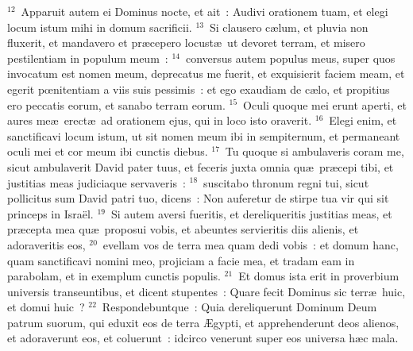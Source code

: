 ${}^{12}$~Apparuit autem ei Dominus nocte, et ait~: Audivi orationem tuam, et elegi locum istum mihi in domum sacrificii.
${}^{13}$~Si clausero c\ae lum, et pluvia non fluxerit, et mandavero et pr\ae cepero locust\ae\ ut devoret terram, et misero pestilentiam in populum meum~:
${}^{14}$~conversus autem populus meus, super quos invocatum est nomen meum, deprecatus me fuerit, et exquisierit faciem meam, et egerit pœnitentiam a viis suis pessimis~: et ego exaudiam de c\ae lo, et propitius ero peccatis eorum, et sanabo terram eorum.
${}^{15}$~Oculi quoque mei erunt aperti, et aures me\ae\ erect\ae\ ad orationem ejus, qui in loco isto oraverit.
${}^{16}$~Elegi enim, et sanctificavi locum istum, ut sit nomen meum ibi in sempiternum, et permaneant oculi mei et cor meum ibi cunctis diebus.
${}^{17}$~Tu quoque si ambulaveris coram me, sicut ambulaverit David pater tuus, et feceris juxta omnia qu\ae\ pr\ae cepi tibi, et justitias meas judiciaque servaveris~:
${}^{18}$~suscitabo thronum regni tui, sicut pollicitus sum David patri tuo, dicens~: Non auferetur de stirpe tua vir qui sit princeps in Isra\"el.
${}^{19}$~Si autem aversi fueritis, et dereliqueritis justitias meas, et pr\ae cepta mea qu\ae\ proposui vobis, et abeuntes servieritis diis alienis, et adoraveritis eos,
${}^{20}$~evellam vos de terra mea quam dedi vobis~: et domum hanc, quam sanctificavi nomini meo, projiciam a facie mea, et tradam eam in parabolam, et in exemplum cunctis populis.
${}^{21}$~Et domus ista erit in proverbium universis transeuntibus, et dicent stupentes~: Quare fecit Dominus sic terr\ae\ huic, et domui huic~?
${}^{22}$~Respondebuntque~: Quia dereliquerunt Dominum Deum patrum suorum, qui eduxit eos de terra \AE gypti, et apprehenderunt deos alienos, et adoraverunt eos, et coluerunt~: idcirco venerunt super eos universa h\ae c mala.

